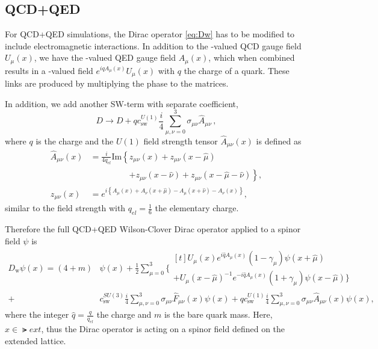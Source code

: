 \subsection{QCD+QED}

For QCD+QED simulations, the Dirac operator \cref{eq:Dw} has to be modified to include electromagnetic interactions.
In addition to the -valued QCD gauge field $U_\mu(x)$, we have the -valued QED gauge field $A_\mu(x)$, which when combined results in a -valued field $e^{i q A_\mu(x)} U_\mu(x)$ with $q$ the charge of a quark. These links are produced by multiplying the  phase to the  matrices.

In addition, we add another SW-term with separate coefficient,
\begin{equation} \label{eq:Dw2}
D \rightarrow D + q c_\mathrm{sw}^{U(1)} \frac{i}{4} \sum_{\mu,\nu=0}^3 \sigma_{\mu \nu} \hat{A}_{\mu \nu}\,,
\end{equation}
where $q$ is the charge and the $U(1)$ field strength tensor $\hat{A}_{\mu \nu}(x)$ is defined as
\begin{align*}
\hat{A}_{\mu \nu}(x) &= \frac{i}{4 q_{el}} \text{Im} \left\{
      z_{\mu \nu}(x)
    + z_{\mu \nu}(x-\hat{\mu})
    \right. \\
    &\phantom{=\frac{i}{4 q_{\text{el}}} \text{Im} \left\{ \right.} \left. 
    + z_{\mu \nu}(x-\hat{\nu})
    + z_{\mu \nu}(x-\hat{\mu}-\hat{\nu})
\right\}, \\
z_{\mu \nu}(x) &= e^{i\left\{
      A_{\mu}(x)
    + A_{\nu}(x+\hat{\mu})
    - A_{\mu}(x+\hat{\nu})
    - A_{\nu}(x)
\right\}},
\end{align*}
similar to the  field strength with $q_{el} = \frac{1}{6}$ the elementary charge.

Therefore the full QCD+QED Wilson-Clover Dirac operator applied to a spinor field $\psi$ is
\begin{equation}
\begin{aligned} \label{eq:Dw:QCD+QED}
D_\mathrm{w} \psi(x) = \left( 4 + m \right) &\psi(x) + \frac{1}{2} \sum_{\mu=0}^3
\Big\{
  \begin{multlined}[t]
    U_{\mu}(x)e^{i \hat{q} A_{\mu}(x)} (1-\gamma_{\mu}) \psi(x + \hat{\mu}) \\
   +U_{\mu}(x-\hat{\mu})^{-1}e^{-i \hat{q} A_{\mu}(x) } (1+\gamma_{\mu}) \psi(x-\hat{\mu})
\Big\} \end{multlined} \\
+&c_\mathrm{sw}^{SU(3)} \frac{i}{4} \sum_{\mu,\nu=0}^3 \sigma_{\mu \nu} \hat{F}_{\mu \nu}(x) \psi(x)
+q c_\mathrm{sw}^{U(1)} \frac{i}{4} \sum_{\mu,\nu=0}^3 \sigma_{\mu \nu} \hat{A}_{\mu \nu}(x) \psi(x),
\end{aligned}
\end{equation}
where the integer $\hat{q} = \frac{q}{q_{el}}$ the charge and $m$ is the bare quark mass.
Here, $x \in \lat{ext}$, thus the Dirac operator is acting on a spinor field defined on the extended lattice.

